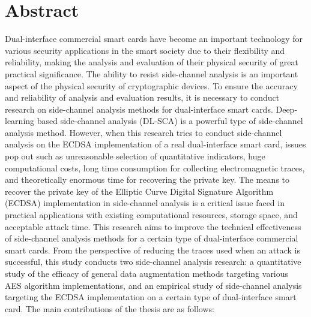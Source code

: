 \intobmk\chapter*{Abstract}%

Dual-interface commercial smart cards have become an important technology for various security applications in the smart society due to their flexibility and reliability, making the analysis and evaluation of their physical security of great practical significance. The ability to resist side-channel analysis is an important aspect of the physical security of cryptographic devices. To ensure the accuracy and reliability of analysis and evaluation results, it is necessary to conduct research on side-channel analysis methods for dual-interface smart cards. Deep-learning based side-channel analysis (DL-SCA) is a powerful type of side-channel analysis method. However, when this research tries to conduct side-channel analysis on the ECDSA implementation of a real dual-interface smart card,  issues pop out such as unreasonable selection of quantitative indicators, huge computational costs, long time consumption for collecting electromagnetic traces, and theoretically enormous time for recovering the private key. The means to recover the private key of the Elliptic Curve Digital Signature Algorithm (ECDSA) implementation in side-channel analysis is a critical issue faced in practical applications with existing computational resources, storage space, and acceptable attack time. This research aims to improve the technical effectiveness of side-channel analysis methods for a certain type of dual-interface commercial smart cards. From the perspective of reducing the traces used when an attack is successful, this study conducts two side-channel analysis research: a quantitative study of the efficacy of general data augmentation methods targeting various AES algorithm implementations, and an empirical study of side-channel analysis targeting the ECDSA implementation on a certain type of dual-interface smart card. The main contributions of the thesis are as follows:

